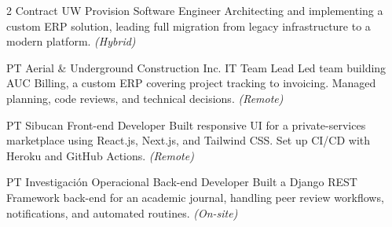\documentclass[10pt]{article} %
\begin{document}
\begin{paracol}{2}
{Contract}
{UW Provision}
{Software Engineer}
{Architecting and implementing a custom ERP solution, leading full migration from legacy infrastructure to a modern platform. \textit{(Hybrid)}}

{PT}
{Aerial \& Underground Construction Inc.}
{IT Team Lead}
{Led team building AUC Billing, a custom ERP covering project tracking to invoicing. Managed planning, code reviews, and technical decisions. \textit{(Remote)}}


{PT}
{Sibucan}
{Front-end Developer}
{Built responsive UI for a private-services marketplace using React.js, Next.js, and Tailwind CSS. Set up CI/CD with Heroku and GitHub Actions. \textit{(Remote)}}


{PT}
{Investigaci\'{o}n Operacional}
{Back-end Developer}
{Built a Django REST Framework back-end for an academic journal, handling peer review workflows, notifications, and automated routines. \textit{(On-site)}}

\vspace{-\baselineskip}\medskip %

\switchcolumn %



\end{paracol}
\end{document}
